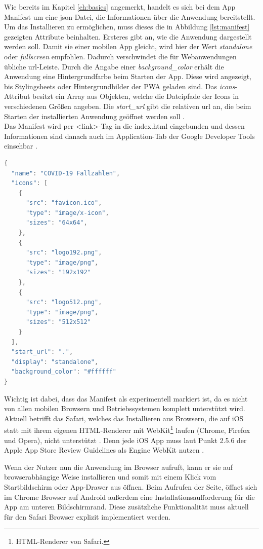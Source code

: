Wie bereits im Kapitel \ref{ch:basics} angemerkt, handelt es sich bei dem App Manifest um eine \ac{json}-Datei, die Informationen über die Anwendung bereitstellt.
Um das Installieren zu ermöglichen, muss dieses die in Abbildung \ref{lst:manifest} gezeigten Attribute beinhalten.
Ersteres gibt an, wie die Anwendung dargestellt werden soll.
Damit sie einer mobilen App gleicht, wird hier der Wert \textit{standalone} oder \textit{fullscreen} empfohlen.
Dadurch verschwindet die für Webanwendungen übliche \ac{url}-Leiste.
Durch die Angabe einer \textit{background\_color} erhält die Anwendung eine Hintergrundfarbe beim Starten der App.
Diese wird angezeigt, bis Stylingsheets oder Hintergrundbilder der PWA geladen sind.
Das \textit{icons}-Attribut besitzt ein Array aus Objekten, welche die Dateipfade der Icons in verschiedenen Größen angeben.
Die \textit{start\_url} gibt die relativen \ac{url} an, die beim Starten der installierten Anwendung geöffnet werden soll \cite{MDNcontributors.d}.\\
Das Manifest wird per \glqq <link>\grqq{}-Tag in die index.html eingebunden und dessen Informationen sind danach auch im Application-Tab der Google Developer Tools einsehbar \cite{Caceres.2021}.

\begin{lstlisting}[language=Java,caption={Fertiges App Manifest der PWA},captionpos=b,label={lst:manifest}]
{
  "name": "COVID-19 Fallzahlen",
  "icons": [
    {
      "src": "favicon.ico",
      "type": "image/x-icon",
      "sizes": "64x64",
    },
    {
      "src": "logo192.png",
      "type": "image/png",
      "sizes": "192x192"
    },
    {
      "src": "logo512.png",
      "type": "image/png",
      "sizes": "512x512"
    }
  ],
  "start_url": ".",
  "display": "standalone",
  "background_color": "#ffffff"
}
\end{lstlisting}

Wichtig ist dabei, dass das Manifest als experimentell markiert ist, da es nicht von allen mobilen Browsern und Betriebssystemen komplett unterstützt wird.
Aktuell betrifft das Safari, welches das Installieren aus Browsern, die auf iOS statt mit ihrem eigenen HTML-Renderer mit WebKit\footnote{HTML-Renderer von Safari.} laufen (Chrome, Firefox und Opera), nicht unterstützt \cite{Deveria.o.J.}.
Denn jede iOS App muss laut Punkt 2.5.6 der Apple App Store Review Guidelines als Engine WebKit nutzen \cite{Apple.07.06.2021}.

Wenn der Nutzer nun die Anwendung im Browser aufruft, kann er sie auf browserabhängige Weise installieren und somit mit einem Klick vom Startbildschirm oder App-Drawer aus öffnen.
Beim Aufrufen der Seite, öffnet sich im Chrome Browser auf Android außerdem eine Installationsaufforderung für die App am unteren Bildschirmrand.
Diese zusätzliche Funktionalität muss aktuell für den Safari Browser explizit implementiert werden.

